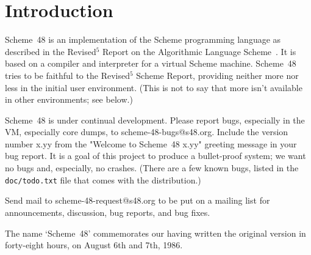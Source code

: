 
\chapter{Introduction}

Scheme~48 is an implementation of the Scheme programming language as
described in the Revised$^5$ Report on the Algorithmic Language
 Scheme~\cite{R5RS}.
It is based on a compiler and interpreter for a virtual Scheme
machine.  Scheme~48 tries to be faithful to the Revised$^5$ Scheme
Report, providing neither more nor less in the initial user
environment.  (This is not to say that more isn't available in other
environments; see below.)

Scheme~48 is under continual development.
Please report bugs, especially in the VM, especially core dumps, to
scheme-48-bugs@s48.org.  Include the version number x.yy
from the "Welcome to Scheme~48 x.yy" greeting message in your bug
report.  It is a goal of this project to produce a bullet-proof
system; we want no bugs and, especially, no crashes.  (There are a few
known bugs, listed in the {\tt doc/todo.txt} file that comes with the
distribution.)

Send mail to scheme-48-request@s48.org to be put on a
mailing list for announcements, discussion, bug reports, and bug
fixes.

The name `Scheme~48' commemorates our having written the original version
 in forty-eight hours, on August 6th and 7th, 1986.

